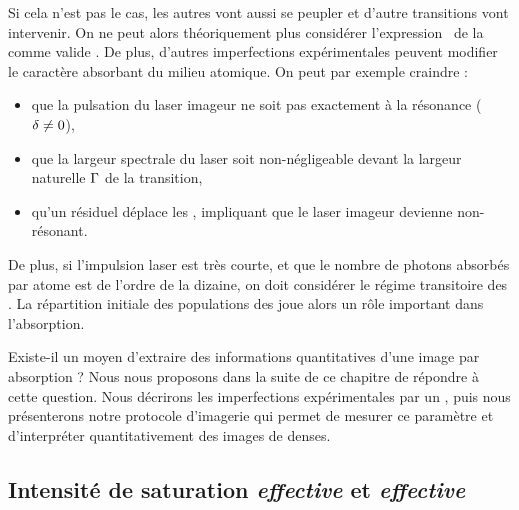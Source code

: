 \noindent Si cela n'est pas le cas, les autres \snZs vont aussi se peupler et d'autre transitions vont intervenir. On ne peut alors théoriquement plus considérer l'expression~ de la \seff comme valide%
.
De plus, d'autres imperfections expérimentales peuvent modifier le caractère absorbant du milieu atomique. On peut par exemple craindre : 
\begin{itemize}
	\item que la pulsation du laser imageur ne soit pas exactement à la résonance (${\delta} \neq 0$),
	\item que la largeur spectrale du laser soit non-négligeable devant la largeur naturelle ${\Gamma}$ de la transition,
	\item qu'un \chm résiduel déplace les \snZs, impliquant que le laser imageur devienne non-résonant.
\end{itemize}
	De plus, si l'impulsion laser est très courte, et que le nombre de photons absorbés par atome est de l'ordre de la dizaine, on doit considérer le régime transitoire des \EBO. La répartition initiale des populations des \snZs joue alors un rôle important dans l'absorption.


\noindent Existe-il un moyen d'extraire des informations quantitatives d'une image par absorption ?
Nous nous proposons dans la suite de ce chapitre de répondre à cette question. Nous décrirons les imperfections expérimentales par un \pdc, puis nous présenterons notre protocole d'imagerie qui permet de mesurer ce paramètre et d'interpréter quantitativement des images de \nats denses.


\subsection{Intensité de saturation \emph{effective} et \seff \emph{effective}}

